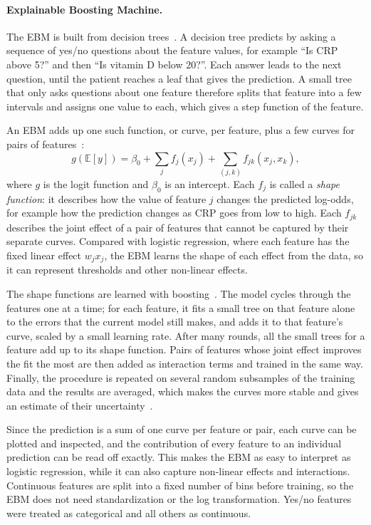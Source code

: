 \documentclass[conference]{IEEEtran}
\begin{document}
\paragraph{Explainable Boosting Machine.}
The EBM is built from decision trees~\cite{breiman1984cart}. A decision tree predicts by asking a
sequence of yes/no questions about the feature values, for example
``Is CRP above 5?'' and then ``Is vitamin D below 20?''. Each answer leads to
the next question, until the patient reaches a leaf that gives the prediction.
A small tree that only asks questions about one feature therefore splits that
feature into a few intervals and assigns one value to each, which gives a step
function of the feature.

An EBM adds up one such function, or curve, per feature, plus a few curves for
pairs of features~\cite{lou2013accurate}:
\begin{equation}
g\left(\mathbb{E}[y]\right) = \beta_0 + \sum_{j} f_j(x_j)
  + \sum_{(j,k)} f_{jk}(x_j, x_k),
\end{equation}
where $g$ is the logit function and $\beta_0$ is an intercept. Each $f_j$ is
called a \emph{shape function}: it describes how the value of feature $j$
changes the predicted log-odds, for example how the prediction changes as CRP
goes from low to high. Each $f_{jk}$ describes the joint effect of a pair of
features that cannot be captured by their separate curves. Compared with
logistic regression, where each feature has the fixed linear effect $w_j x_j$,
the EBM learns the shape of each effect from the data, so it can represent
thresholds and other non-linear effects.

The shape functions are learned with boosting~\cite{lou2013accurate,
nori2019interpretml}. The model cycles through the features one at a time; for
each feature, it fits a small tree on that feature alone to the errors that
the current model still makes, and adds it to that feature's curve, scaled by
a small learning rate. After many rounds, all the small trees for a feature add
up to its shape function. Pairs of features whose joint effect improves the
fit the most are then added as interaction terms and trained in the same way.
Finally, the procedure is repeated on several random subsamples of the
training data and the results are averaged, which makes the curves more stable
and gives an estimate of their uncertainty~\cite{nori2019interpretml}.

Since the prediction is a sum of one curve per feature or pair, each curve can
be plotted and inspected, and the contribution of every feature to an
individual prediction can be read off exactly. This makes the EBM as easy to
interpret as logistic regression, while it can also capture non-linear effects
and interactions. Continuous features are split into a fixed number of bins
before training, so the EBM does not need standardization or the log
transformation. Yes/no features were treated as categorical and all others as
continuous.
\end{document}
